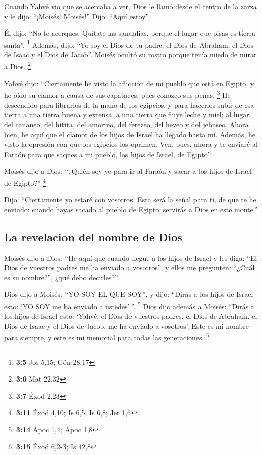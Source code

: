  Cuando Yahvé vio que se acercaba a ver, Dios le llamó
desde el centro de la zarza y le dijo: ``¡Moisés! Moisés!'' Dijo: ``Aquí
estoy''.

 Él dijo: ``No te acerques. Quítate las sandalias, porque
el lugar que pisas es tierra santa''. \footnote{\textbf{3:5} Jos 5,15;
  Gén 28,17}  Además, dijo: ``Yo soy el Dios de tu padre,
el Dios de Abraham, el Dios de Isaac y el Dios de Jacob''. Moisés ocultó
su rostro porque tenía miedo de mirar a Dios. \footnote{\textbf{3:6} Mat
  22,32}

 Yahvé dijo: ``Ciertamente he visto la aflicción de mi
pueblo que está en Egipto, y he oído su clamor a causa de sus capataces,
pues conozco sus penas. \footnote{\textbf{3:7} Éxod 2,23} 
He descendido para librarlos de la mano de los egipcios, y para hacerlos
subir de esa tierra a una tierra buena y extensa, a una tierra que fluye
leche y miel; al lugar del cananeo, del hitita, del amorreo, del
ferezeo, del heveo y del jebuseo.  Ahora bien, he aquí que
el clamor de los hijos de Israel ha llegado hasta mí. Además, he visto
la opresión con que los egipcios los oprimen.  Ven, pues,
ahora y te enviaré al Faraón para que saques a mi pueblo, los hijos de
Israel, de Egipto''.

 Moisés dijo a Dios: ``¿Quién soy yo para ir al Faraón y
sacar a los hijos de Israel de Egipto?'' \footnote{\textbf{3:11} Éxod
  4,10; Is 6,5; Is 6,8; Jer 1,6}

 Dijo: ``Ciertamente yo estaré con vosotros. Esta será la
señal para ti, de que te he enviado: cuando hayas sacado al pueblo de
Egipto, servirás a Dios en este monte.''

\hypertarget{la-revelacion-del-nombre-de-dios}{%
\subsection{La revelacion del nombre de
Dios}\label{la-revelacion-del-nombre-de-dios}}

 Moisés dijo a Dios: ``He aquí que cuando llegue a los
hijos de Israel y les diga: ``El Dios de vuestros padres me ha enviado a
vosotros'', y ellos me pregunten: ``¿Cuál es su nombre?'', ¿qué debo
decirles?''

 Dios dijo a Moisés: ``YO SOY EL QUE SOY'', y dijo:
``Dirás a los hijos de Israel esto: `YO SOY me ha enviado a
ustedes'\,''. \footnote{\textbf{3:14} Apoc 1,4; Apoc 1,8}
 Dios dijo además a Moisés: ``Dirás a los hijos de Israel
esto: `Yahvé, el Dios de vuestros padres, el Dios de Abraham, el Dios de
Isaac y el Dios de Jacob, me ha enviado a vosotros'. Este es mi nombre
para siempre, y este es mi memorial para todas las generaciones.
\footnote{\textbf{3:15} Éxod 6,2-3; Is 42,8}

